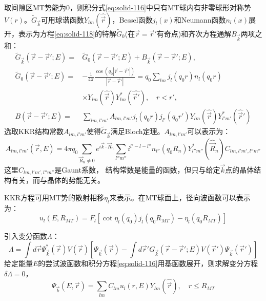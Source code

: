 取间隙区MT势能为0，则积分式\eqref{eq:solid-116}中只有MT球内有非零球形对称势$V(r)$。$\tilde G_{\vec k}$可用球谐函数$Y_{lm}(\hat{\vec r})$，Bessel函数$j_l(x)$和Neumann函数$n_l(x)$展开，表示为方程\eqref{eq:solid-118}的特解$\tilde G_0$(在$\vec r=\vec r'$有奇点)和齐次方程通解$B_{\vec k}$两项之和：
\begin{equation}
  \begin{split}
    \tilde G_{\vec k}(\vec r-\vec r';E)=&\tilde G_0(\vec r-\vec r';E)+B_{\vec k}(\vec r-\vec r';E),\\
    \tilde G_0(\vec r-\vec r';E)=&-\frac1{4\pi}\frac{\cos(q_0|\vec r-\vec r'|)}{|\vec r-\vec r'|}=q_0\sum_{lm}j_l(q_0r)n_l(q_0r)\\
    &\times Y_{lm}(\hat{\vec r})Y_{lm}^{\ast}(\hat{\vec r'}),\quad r<r',\\
    B(\vec r-\vec r';E)=&\sum_{lm,l'm'}A_{lm,l'm'}j_l(q_0r)j_{l'}(q_0r')Y_{lm}(\hat{\vec r})Y_{l'm'}^{\ast}(\hat{\vec r}')
  \end{split}
  \label{eq:solid-119}
\end{equation}
选取KKR结构常数$A_{lm,l'm'}$使得$\tilde G_{\vec k}$满足Bloch定理。$A_{lm,l'm'}$可以表示为\cite{MCP8-251_1968}：
\begin{equation}
  A_{lm,l'm'}(\vec r,E)=4\pi q_0\sum_{\vec R_n\neq0}e^{i\vec k\cdot\vec R_n}\sum_{l''m''}i^{l'-l-l''}n_{l''}(q_0R_n)Y_{l''m''}^{\ast}(\hat{\vec R}_n)C_{lm,l'm',l''m''}
  \label{eq:solid-120}
\end{equation}
这里$C_{lm,l'm',l''m''}$是Gaunt系数，
结构常数是能量的函数，但只与给定$\vec k$点的晶体结构有关，而与晶体的势能无关。

KKR方程可用MT势的散射相移$\eta_l$来表示。在MT球面上，径向波函数可以表示为：
\begin{equation}
  u_l(E,R_{MT})=F_l[\cot\eta_l(q_0)j_l(q_0R_{MT})-\eta_l(q_0R_{MT})]
  \label{eq:solid-125}
\end{equation}

引入变分函数$\Lambda$：
\begin{equation}
  \Lambda=\int d\vec r\Psi_{\vec k}^{\ast}(\vec r)V(\vec r)\left[\Psi_{\vec k}(\vec r)-\int d\vec r'G_{\vec k}(\vec r-\vec r';E)V(\vec r')\Psi_{\vec k}(\vec r')\right]
  \label{eq:solid-122}
\end{equation}
给定能量$E$的尝试波函数和积分方程\eqref{eq:solid-116}用基函数展开，则求解变分方程$\delta\Lambda=0$\cite{PR94-1111_1954}，
\begin{equation}
  \Psi_{\vec k}(E,\vec r)=\sum_{lm}C_{lm}u_l(r,E)Y_{lm}(\hat{\vec r}),\quad r\leqslant R_{MT}
  \label{eq:solid-123}
\end{equation}

